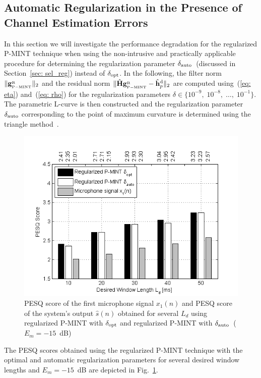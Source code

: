 \documentclass[10pt]{IEEEtran}
\begin{document}
\subsection{Automatic Regularization in the Presence of Channel Estimation Errors}
\label{sec: auto}
In this section we will investigate the performance degradation for the regularized P-MINT technique when using the non-intrusive and practically applicable procedure for determining the regularization parameter $\delta_{\rm auto}$~(discussed in Section~\ref{sec: sel_reg}) instead of $\delta_{\rm opt}$.
In the following, the filter norm $\|\mathbf{g}_{{}_{\rm P-MINT}}^{{_{\rm R}}}\|_2$ and the residual norm $\|\hat{\mathbf{H}}\mathbf{g}_{{}_{\rm P-MINT}}^{{_{\rm R}}} - \hat{\mathbf{h}}_p^{\rm d} \|_2$ are computed using~(\ref{eq: eta}) and~(\ref{eq: rho}) for the regularization parameters $\delta \in \{10^{-9}, \; 10^{-8}, \; \ldots, \; 10^{-1} \}$.
The parametric L-curve is then constructed and the regularization parameter $\delta_{\rm auto}$ corresponding to the point of maximum curvature is determined using the triangle method~\cite{Castellanos_2002}.
\begin{figure}[t!]
\centering
\includegraphics[scale = 0.57]{Plots/PESQ_optandautofixederror_sys_3_error_-15}
\caption{PESQ score of the first microphone signal $x_1(n)$ and PESQ score of the system's output $\hat{s}(n)$ obtained for several $L_d$ using regularized P-MINT with $\delta_{\rm opt}$ and regularized P-MINT with $\delta_{\rm auto}$~($E_m = -15$~dB)}
\label{fig: autopesq1}
\end{figure}
The PESQ scores obtained using the regularized P-MINT technique with the optimal and automatic regularization parameters for several desired window lengths and $E_m = -15$~dB are depicted in Fig.~\ref{fig: autopesq1}.
\end{document}
